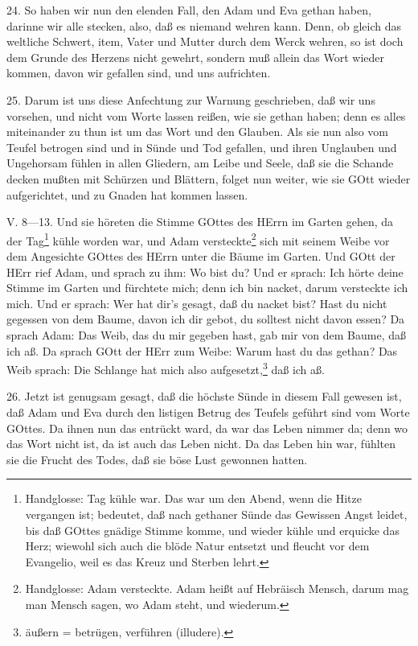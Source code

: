 24. So haben wir nun den elenden Fall, den Adam und Eva gethan haben, darinne wir alle stecken, also, daß es niemand wehren kann. Denn, ob gleich das weltliche Schwert, item, Vater und Mutter durch dem Werck wehren, so ist doch dem Grunde des Herzens nicht gewehrt, sondern muß allein das Wort wieder kommen, davon wir gefallen sind, und uns aufrichten.

25. Darum ist uns diese Anfechtung zur Warnung geschrieben, daß wir uns vorsehen, und nicht vom Worte lassen reißen, wie sie gethan haben; denn es alles miteinander zu thun ist um das Wort und den Glauben. Als sie nun also vom Teufel betrogen sind und in Sünde und Tod gefallen, und ihren Unglauben und Ungehorsam fühlen in allen Gliedern, am Leibe und Seele, daß sie die Schande decken mußten mit Schürzen und Blättern, folget nun weiter, wie sie GOtt wieder aufgerichtet, und zu Gnaden hat kommen lassen.
\begin{schriftzitat}
V. 8—13. Und sie höreten die Stimme GOttes des HErrn im Garten gehen, da der Tag\footnote{Handglosse: Tag kühle war. Das war um den Abend, wenn die Hitze vergangen ist; bedeutet, daß nach gethaner Sünde das Gewissen Angst leidet, bis daß GOttes gnädige Stimme komme, und wieder kühle und erquicke das Herz; wiewohl sich auch die blöde Natur entsetzt und fleucht vor dem Evangelio, weil es das Kreuz und Sterben lehrt.} kühle worden war, und Adam versteckte\footnote{Handglosse: Adam versteckte. Adam heißt auf Hebräisch Mensch, darum mag man Mensch sagen, wo Adam steht, und wiederum.} sich mit seinem Weibe vor dem Angesichte GOttes des HErrn unter die Bäume im Garten. Und GOtt der HErr rief Adam, und sprach zu ihm: Wo bist du? Und er sprach: Ich hörte deine Stimme im Garten und fürchtete mich; denn ich bin nacket, darum versteckte ich mich. Und er sprach: Wer hat dir’s gesagt, daß du nacket bist? Hast du nicht gegessen von dem Baume, davon ich dir gebot, du solltest nicht davon essen? Da sprach Adam: Das Weib, das du mir gegeben hast, gab mir von dem Baume, daß ich aß. Da sprach GOtt der HErr zum Weibe: Warum hast du das gethan? Das Weib sprach: Die Schlange hat mich also aufgesetzt,\footnote{äußern = betrügen, verführen (illudere).} daß ich aß.
\end{schriftzitat}

26. Jetzt ist genugsam gesagt, daß die höchste Sünde in diesem Fall gewesen ist, daß Adam und Eva durch den listigen Betrug des Teufels geführt sind vom Worte GOttes. Da ihnen nun das entrückt ward, da war das Leben nimmer da; denn wo das Wort nicht ist, da ist auch das Leben nicht. Da das Leben hin war, fühlten sie die Frucht des Todes, daß sie böse Lust gewonnen hatten.

